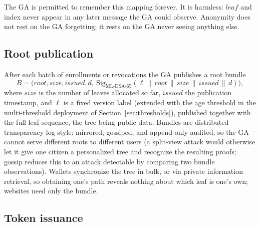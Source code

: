 \documentclass[11pt]{article}
\theoremstyle{definition}
\begin{document}
The GA is permitted to remember this mapping forever. It is harmless: $\mathit{leaf}$ and
index never appear in any later message the GA could observe. Anonymity does not rest on
the GA forgetting; it rests on the GA never seeing anything else.

\subsection{Root publication}
\label{sec:rootpub}

After each batch of enrollments or revocations the GA publishes a root bundle
\[
B = \bigl(\mathit{root}, \mathit{size}, \mathit{issued}, d,\
\mathrm{Sig}_{\text{ML-DSA-65}}(\ell \,\|\, \mathit{root} \,\|\, \mathit{size} \,\|\,
\mathit{issued} \,\|\, d)\bigr),
\]
where $\mathit{size}$ is the number of leaves allocated so far, $\mathit{issued}$ the
publication timestamp, and $\ell$ is a fixed version label (extended with the age threshold in the
multi-threshold deployment of Section~\ref{sec:thresholds}), published together with the
full leaf sequence, the tree being public data. Bundles are distributed
transparency-log style: mirrored, gossiped, and append-only audited, so the GA cannot
serve different roots to different users (a split-view attack would otherwise let it give
one citizen a personalized tree and recognize the resulting proofs; gossip reduces this to
an attack detectable by comparing two bundle observations). Wallets synchronize the tree
in bulk, or via private information retrieval, so obtaining one's path reveals nothing
about which leaf is one's own; websites need only the bundle.

\subsection{Token issuance}
\label{sec:issuance}
\end{document}
